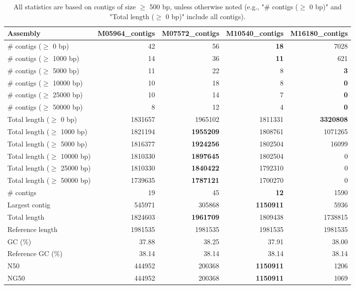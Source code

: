 \documentclass[12pt,a4paper]{article}
\begin{document}
\begin{table}[ht]
\begin{center}
\caption{All statistics are based on contigs of size $\geq$ 500 bp, unless otherwise noted (e.g., "\# contigs ($\geq$ 0 bp)" and "Total length ($\geq$ 0 bp)" include all contigs).}
\begin{tabular}{|l*{4}{|r}|}
\hline
Assembly & M05964\_contigs & M07572\_contigs & M10540\_contigs & M16180\_contigs \\ \hline
\# contigs ($\geq$ 0 bp) & 42 & 56 & {\bf 18} & 7028 \\ \hline
\# contigs ($\geq$ 1000 bp) & 14 & 36 & {\bf 11} & 621 \\ \hline
\# contigs ($\geq$ 5000 bp) & 11 & 22 & 8 & {\bf 3} \\ \hline
\# contigs ($\geq$ 10000 bp) & 10 & 18 & 8 & {\bf 0} \\ \hline
\# contigs ($\geq$ 25000 bp) & 10 & 14 & 7 & {\bf 0} \\ \hline
\# contigs ($\geq$ 50000 bp) & 8 & 12 & 4 & {\bf 0} \\ \hline
Total length ($\geq$ 0 bp) & 1831657 & 1965102 & 1811331 & {\bf 3320808} \\ \hline
Total length ($\geq$ 1000 bp) & 1821194 & {\bf 1955209} & 1808761 & 1071265 \\ \hline
Total length ($\geq$ 5000 bp) & 1816377 & {\bf 1924256} & 1802504 & 16099 \\ \hline
Total length ($\geq$ 10000 bp) & 1810330 & {\bf 1897645} & 1802504 & 0 \\ \hline
Total length ($\geq$ 25000 bp) & 1810330 & {\bf 1840422} & 1792310 & 0 \\ \hline
Total length ($\geq$ 50000 bp) & 1739635 & {\bf 1787121} & 1700270 & 0 \\ \hline
\# contigs & 19 & 45 & {\bf 12} & 1590 \\ \hline
Largest contig & 545971 & 305868 & {\bf 1150911} & 5936 \\ \hline
Total length & 1824603 & {\bf 1961709} & 1809438 & 1738815 \\ \hline
Reference length & 1981535 & 1981535 & 1981535 & 1981535 \\ \hline
GC (\%) & 37.88 & 38.25 & 37.91 & 38.00 \\ \hline
Reference GC (\%) & 38.14 & 38.14 & 38.14 & 38.14 \\ \hline
N50 & 444952 & 200368 & {\bf 1150911} & 1206 \\ \hline
NG50 & 444952 & 200368 & {\bf 1150911} & 1069 \\ \hline

\end{tabular}
\end{center}
\end{table}
\end{document}
